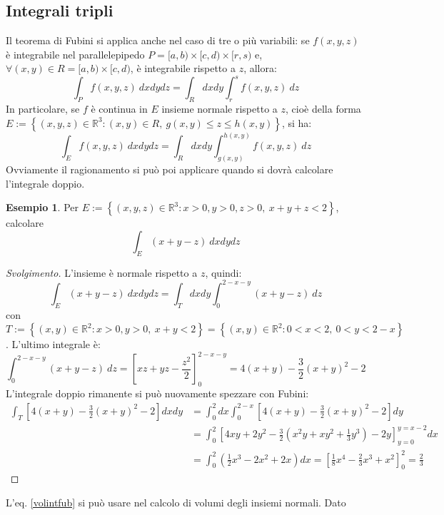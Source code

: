 \documentclass[10pt, a4paper]{scrartcl}
\newenvironment{svolgimento}{\renewcommand\qedsymbol{$\blacksquare$}\begin{proof}[Svolgimento]}{\end{proof}}
\theoremstyle{definition}
\newtheorem{esempio}{Esempio}
\numberwithin{esempio}{section}
\theoremstyle{definition}
\numberwithin{obs}{section}
\numberwithin{nota}{section}
\numberwithin{equation}{subsection}
\begin{document}
\subsection{Integrali tripli}
Il teorema di Fubini si applica anche nel caso di tre o pi\`u variabili: se $f(x,y,z)$ \`e integrabile nel parallelepipedo $P = [a,b) \times [c,d) \times [r,s)$ e, $\forall (x,y) \in R = [a,b) \times [c,d)$, \`e integrabile rispetto a $z$, allora:
\[
\int_{P} f(x,y,z) \ dxdydz = \int_{R} dxdy \int_{r} ^s f(x,y,z) \ dz
\] 
In particolare, se $f$ \`e continua in $E$ insieme normale rispetto a $z$, cio\`e della forma $E:= \left\{ (x,y,z) \in \mathbb{R}^3 : (x,y) \in R, \ g(x,y)\le z \le h(x,y) \right\} $, si ha:
\begin{equation}\label{volintfub}
	\int_{E} f(x,y,z) \ dxdydz = \int_{R} dxdy \int_{g(x,y)} ^{h(x,y)} f(x,y,z) \ dz
\end{equation}
Ovviamente il ragionamento si pu\`o poi applicare quando si dovr\`a calcolare l'integrale doppio.
\begin{esempio}
Per $E:=\left\{ (x,y,z) \in \mathbb{R}^3 : x>0,y>0,z>0, \ x+y+z < 2\right\} $, calcolare
\[
\int_{E} (x+y-z) \ dxdydz
\] 
\begin{svolgimento}
	L'insieme \`e normale rispetto a $z$, quindi:
	\[
	\int_{E} (x+y-z) \ dxdydz = \int_{T} dxdy \int_{0} ^{2-x-y}  (x+y-z) \ dz
	\] 
	con $T:= \left\{ (x,y) \in \mathbb{R}^2:x>0,y>0, \ x+y <2 \right\} = \left\{ (x,y) \in \mathbb{R}^2 : 0<x<2, \ 0<y<2-x \right\}  $. 
	L'ultimo integrale \`e:
	\[
	\int_{0} ^{2-x-y} (x+y-z) \ dz = \left[ xz + yz - \frac{z^2}{2} \right] _{0} ^{2-x-y}  = 4(x+y) - \frac{3}{2}(x+y)^2 - 2
	\] 
	L'integrale doppio rimanente si pu\`o nuovamente spezzare con Fubini:
	\[
	\begin{split}
		\int_{T} \left[ 4(x+y) - \frac{3}{2}(x+y)^2 - 2\right]  dxdy &= \int_{0} ^2 dx \int_{0} ^{2- x} \left[ 4(x+y) - \frac{3}{2}(x+y)^2 - 2\right] dy\\
									     &=\int_{0} ^2 \left[ 4xy + 2y^2 - \frac{3}{2}\left(x^2 y + xy^2  + \frac{1}{3}y^3\right) -2y \right] _{y=0} ^{y= x-2} dx \\
									     &=\int_{0} ^2 \left(\frac{1}{2}x^3 - 2 x^2 + 2x\right) dx = \left[ \frac{1}{8} x^4 - \frac{2}{3}x^3 + x^2\right] _0^2= \frac{2}{3}
	\end{split}
	\] 
	
\end{svolgimento}
\end{esempio}
\noindent L'eq. \ref{volintfub} si pu\`o usare nel calcolo di volumi degli insiemi normali. Dato 
\end{document}
